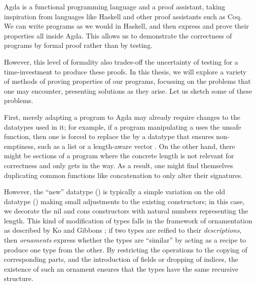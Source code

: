 Agda \cite{agda} is a functional programming language and a proof assistant, taking inspiration from languages like Haskell and other proof assistants such as Coq. We can write programs as we would in Haskell, and then express and prove their properties all inside Agda. This allows us to demonstrate the correctness of programs by formal proof rather than by testing. 

However, this level of formality also trades-off the uncertainty of testing for a time-investment to produce these proofs. In this thesis, we will explore a variety of methods of proving properties of our programs, focussing on the problems that one may encounter, presenting solutions as they arise. Let us sketch some of these problems.

First, merely adapting a program to Agda may already require changes to the datatypes used in it; for example, if a program manipulating a  uses the unsafe  function, then one is forced to replace the  by a datatype that ensures non-emptiness, such as a  list or a length-aware vector . On the other hand, there might be sections of a program where the concrete length is not relevant for correctness and only gets in the way. As a result, one might find themselves duplicating common functions like concatenation \AgdaFunction{\_++\_} to only alter their signatures.

However, the ``new'' datatype () is typically a simple variation on the old datatype () making small adjustments to the existing constructors; in this case, we decorate the nil and cons constructors with natural numbers representing the length. This kind of modification of types falls in the framework of ornamentation as described by Ko and Gibbons \cite{progorn}; if two types are reified to their \textit{descriptions}, then \textit{ornaments} express whether the types are ``similar'' by acting as a recipe to produce one type from the other. By restricting the operations to the copying of corresponding parts, and the introduction of fields or dropping of indices, the existence of such an ornament ensures that the types have the same recursive structure.



